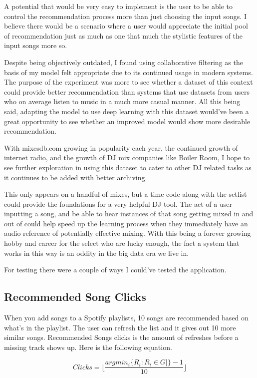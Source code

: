 A potential that would be very easy to implement is the user to be able to control the recommendation process more than just choosing the input songs. I believe there would be a scenario where a user would appreciate the initial pool of recommendation just as much as one that much the stylistic features of the input songs more so.

Despite being objectively outdated, I found using collaborative filtering as the basis of my model felt appropriate due to its continued usage in modern systems. The purpose of the experiment was more to see whether a dataset of this context could provide better recommendation than systems that use datasets from users who on average listen to music in a much  more casual manner. All this being said, adapting the model to use deep learning with this dataset would've been a great opportunity to see whether an improved model would show more desirable recommendation.

With mixesdb.com growing in popularity each year, the continued growth of internet radio, and the growth of DJ mix companies like Boiler Room, I hope to see further exploration in using this dataset to cater to other DJ related tasks as it continues to be added with better archiving. 

This only appears on a handful of mixes, but a time code along with the setlist could provide the foundations for a very helpful DJ tool. The act of a user inputting a song, and be able to hear instances of that song getting mixed in and out of could help speed up the learning process when they immediately have an audio reference of potentially effective mixing. With this being a forever growing hobby and career for the select who are lucky enough, the fact a system that works in this way is an oddity in the big data era we live in. 

For testing there were a couple of ways I could've tested the application. 

\subsection{Recommended Song Clicks}
When you add songs to a Spotify playlists, 10 songs are recommended based on what's in the playlist. The user can refresh the list and it gives out 10 more similar songs. Recommended Songs clicks is the amount of refreshes before a missing track shows up. Here is the following equation.

\begin{equation}
	Clicks= \lfloor \frac {argmin_{i}  \{ R_{i} : R_{i} \in G | \} -1} { 10 } \rfloor
\end{equation}



